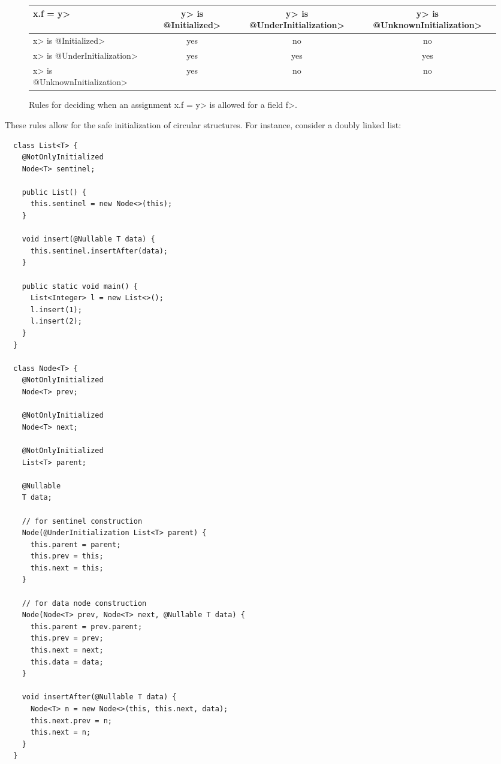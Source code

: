 \begin{figure}
\centering
\begin{tabular}{l|ccc}
  \<x.f = y>&\<y> is \<@Initialized>& \<y> is \<@UnderInitialization>& \<y> is \<@UnknownInitialization>\\ \hline
  \<x> is \<@Initialized> & yes & no & no \\
  \<x> is \<@UnderInitialization> & yes & yes & yes \\
  \<x> is \<@UnknownInitialization> & yes & no & no \\
\end{tabular}
\caption{Rules for deciding when an assignment \<x.f = y> is allowed for a
 field \<f>.}
\label{fig-init-write-field}
\end{figure}

These rules allow for the safe initialization of circular structures.  For instance,
consider a doubly linked list:

\begin{Verbatim}
  class List<T> {
    @NotOnlyInitialized
    Node<T> sentinel;

    public List() {
      this.sentinel = new Node<>(this);
    }

    void insert(@Nullable T data) {
      this.sentinel.insertAfter(data);
    }

    public static void main() {
      List<Integer> l = new List<>();
      l.insert(1);
      l.insert(2);
    }
  }

  class Node<T> {
    @NotOnlyInitialized
    Node<T> prev;

    @NotOnlyInitialized
    Node<T> next;

    @NotOnlyInitialized
    List<T> parent;

    @Nullable
    T data;

    // for sentinel construction
    Node(@UnderInitialization List<T> parent) {
      this.parent = parent;
      this.prev = this;
      this.next = this;
    }

    // for data node construction
    Node(Node<T> prev, Node<T> next, @Nullable T data) {
      this.parent = prev.parent;
      this.prev = prev;
      this.next = next;
      this.data = data;
    }

    void insertAfter(@Nullable T data) {
      Node<T> n = new Node<>(this, this.next, data);
      this.next.prev = n;
      this.next = n;
    }
  }
\end{Verbatim}

